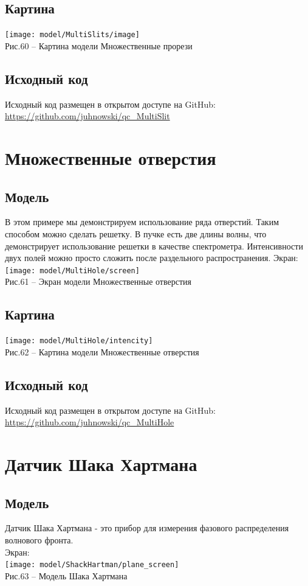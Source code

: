 \documentclass[11pt]{report}
\begin{document}
\subsection{Картина}
\texttt{[image: model/MultiSlits/image]} \\
Рис.60 -- Картина модели Множественные прорези \\
\subsection{Исходный код}
Исходный код размещен в открытом доступе на GitHub: \url{https://github.com/juhnowski/qc_MultiSlit}\\

\section{Множественные отверстия}
\subsection{Модель}
В этом примере мы демонстрируем использование ряда отверстий. Таким способом можно сделать решетку. В пучке есть две длины волны, что демонстрирует использование решетки в качестве спектрометра. Интенсивности двух полей можно просто сложить после раздельного распространения.
Экран: \\
\texttt{[image: model/MultiHole/screen]} \\
Рис.61 -- Экран модели Множественные отверстия \\
\subsection{Картина}
\texttt{[image: model/MultiHole/intencity]} \\
Рис.62 -- Картина модели Множественные отверстия \\
\subsection{Исходный код}
Исходный код размещен в открытом доступе на GitHub: \url{https://github.com/juhnowski/qc_MultiHole}\\

\section{Датчик Шака Хартмана}
\subsection{Модель}
Датчик Шака Хартмана - это прибор для измерения фазового распределения волнового фронта.\\
Экран:\\
\texttt{[image: model/ShackHartman/plane\_screen]} \\
Рис.63 -- Модель Шака Хартмана \\
\end{document}
